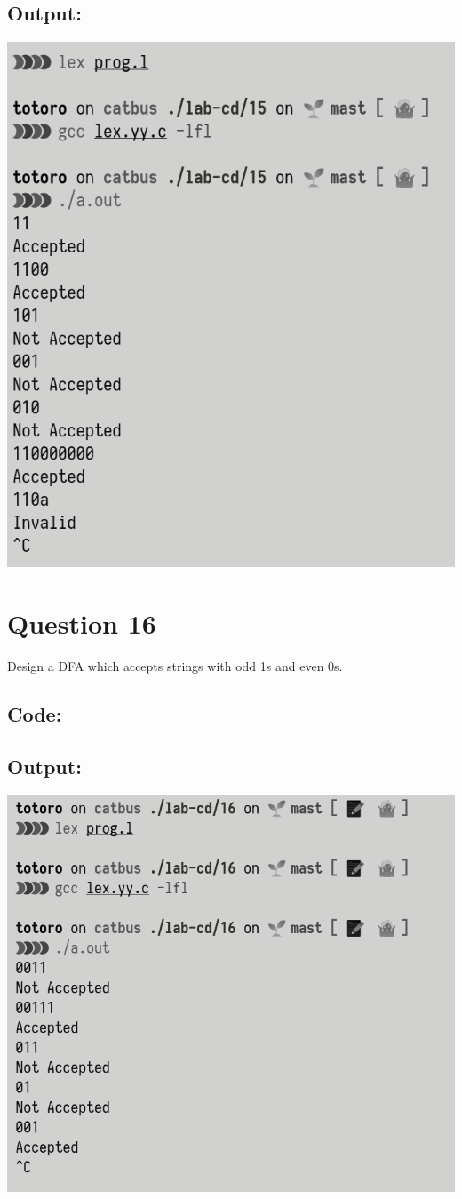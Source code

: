 \documentclass{article}
\begin{document}
\subsection*{Output:}
\begin{center}
  \includegraphics[width=14cm]{15/out.png}
\end{center}

\newpage
\section*{Question 16}
Design a DFA which accepts strings with odd 1s and even 0s.
\subsection*{Code:}

\newpage
\subsection*{Output:}
\begin{center}
  \includegraphics[width=14cm]{16/out.png}
\end{center}
\end{document}
